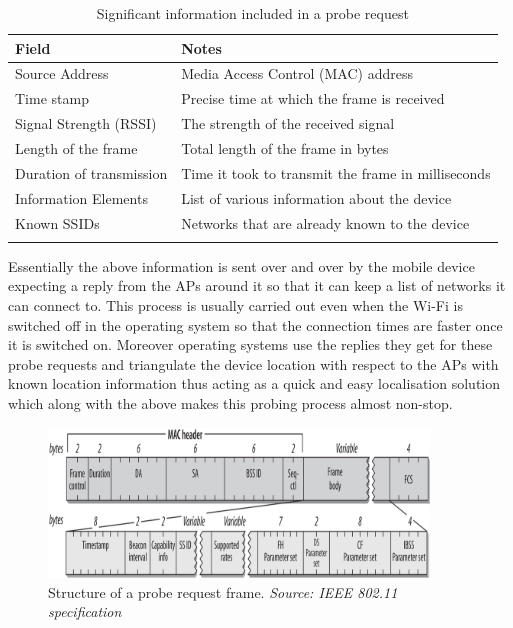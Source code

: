 \begin{table}
  \footnotesize
  \begin{center}
    \begin{tabular}{lp{6.5cm}}
      \toprule
        Field & Notes\\
      \midrule
        \addlinespace[0.2cm]
        Source Address & Media Access Control (MAC) address\\
        \addlinespace[0.2cm]
        Time stamp & Precise time at which the frame is received\\
        \addlinespace[0.2cm]
        Signal Strength (RSSI) & The strength of the received signal\\
        \addlinespace[0.2cm]
        Length of the frame & Total length of the frame in bytes\\
        \addlinespace[0.2cm]
        Duration of transmission & Time it took to transmit the frame in milliseconds\\
        \addlinespace[0.2cm]
        Information Elements & List of various information about the device\\
        \addlinespace[0.2cm]
        Known SSIDs & Networks that are already known to the device\\
        \addlinespace[0.1cm]
      \bottomrule
    \end{tabular}
  \end{center}
  \caption{Significant information included in a probe request}
  \label{table:collection:proberequest}
\end{table}

Essentially the above information is sent over and over by the mobile device expecting a reply from the APs around it so that it can keep a list of networks it can connect to.
This process is usually carried out even when the Wi-Fi is switched off in the operating system so that the connection times are faster once it is switched on.
Moreover operating systems use the replies they get for these probe requests and triangulate the device location with respect to the APs with known location information thus acting as a quick and easy localisation solution which along with the above makes this probing process almost non-stop. 

\begin{figure}
  \includegraphics[width=0.9\textwidth,trim={0 -30 0 -10},clip]{images/probe-request-structure.png}
  \caption{Structure of a probe request frame. \textit{Source: IEEE 802.11 specification}}
  \label{figure:collection:proberequest}
\end{figure}


